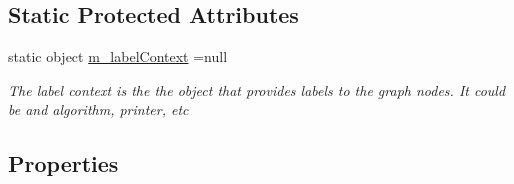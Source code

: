 \subsection*{Static Protected Attributes}
\begin{DoxyCompactItemize}
\item 
static object \hyperlink{class_graph_library_1_1_c_graph_node_a6778251b91c25126259a1c838324eea4}{m\+\_\+label\+Context} =null
\begin{DoxyCompactList}\small\item\em The label context is the the object that provides labels to the graph nodes. It could be and algorithm, printer, etc \end{DoxyCompactList}\end{DoxyCompactItemize}
\subsection*{Properties}
